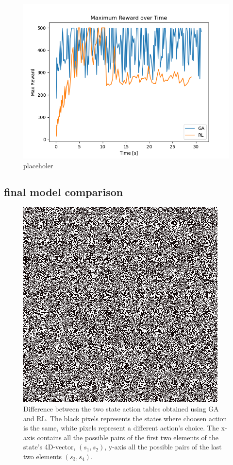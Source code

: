 \begin{figure}[H]
	\centering
	\includegraphics [scale = 0.5]{Images/RL_GA_comparison_max.png}
	\caption{placeholer}
	\label{figMAX}
\end{figure}



\subsection{final model comparison}

\begin{figure}[H]
	\centering
	\includegraphics [scale = 0.7]{Images/diff.png}
	\caption{Difference between the two state action tables obtained using GA and RL. The black pixels represents the states where choosen action is the same, white pixels represent a different action's choice. The x-axis contains all the possible pairs of the first two elements of the state's 4D-vector, $(s_1,s_2)$, y-axis all the possible pairs of the last two elements $(s_3,s_4)$. }
	\label{figTABLEDIFF}
\end{figure}


